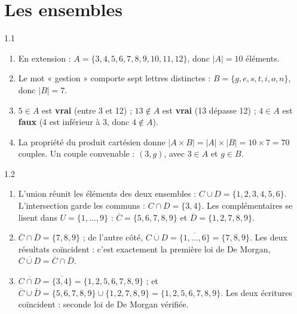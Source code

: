 \chapter{Les ensembles}

\begin{corrige}{1.1}
\begin{enumerate}
\item En extension : $A = \{3, 4, 5, 6, 7, 8, 9, 10, 11, 12\}$, donc $|A| = 10$ éléments.
\item Le mot « gestion » comporte sept lettres distinctes : $B = \{g, e, s, t, i, o, n\}$, donc $|B| = 7$.
\item $5 \in A$ est \textbf{vrai} (entre 3 et 12) ; $13 \notin A$ est \textbf{vrai} (13 dépasse 12) ; $4 \in A$ est \textbf{faux} (4 est inférieur à 3, donc $4 \notin A$).
\item La propriété du produit cartésien donne $|A \times B| = |A| \times |B| = 10 \times 7 = 70$ couples. Un couple convenable : $(3, g)$, avec $3 \in A$ et $g \in B$.
\end{enumerate}
\end{corrige}

\begin{corrige}{1.2}
\begin{enumerate}
\item L'union réunit les éléments des deux ensembles : $C \cup D = \{1, 2, 3, 4, 5, 6\}$. L'intersection garde les communs : $C \cap D = \{3, 4\}$. Les complémentaires se lisent dans $U = \{1, \dots, 9\}$ : $\overline{C} = \{5, 6, 7, 8, 9\}$ et $\overline{D} = \{1, 2, 7, 8, 9\}$.
\item $\overline{C} \cap \overline{D} = \{7, 8, 9\}$ ; de l'autre côté, $\overline{C \cup D} = \overline{\{1, \dots, 6\}} = \{7, 8, 9\}$. Les deux résultats coïncident : c'est exactement la première loi de De Morgan, $\overline{C \cup D} = \overline{C} \cap \overline{D}$.
\item $\overline{C \cap D} = \overline{\{3, 4\}} = \{1, 2, 5, 6, 7, 8, 9\}$ ; et $\overline{C} \cup \overline{D} = \{5, 6, 7, 8, 9\} \cup \{1, 2, 7, 8, 9\} = \{1, 2, 5, 6, 7, 8, 9\}$. Les deux écritures coïncident : seconde loi de De Morgan vérifiée.
\end{enumerate}
\end{corrige}

